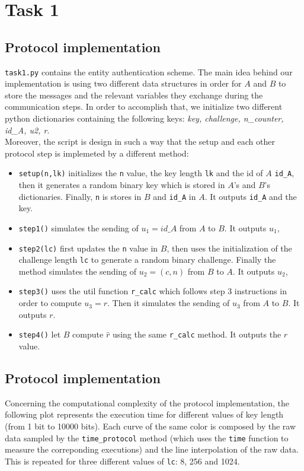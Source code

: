\documentclass{report}
\begin{document}
\section*{Task 1}
\subsection*{Protocol implementation}
{\tt task1.py} contains the entity authentication scheme. The main idea behind our implementation is using two different data structures in order for $A$ and $B$ to store the messages and the relevant variables they exchange during the communication steps. In order to accomplish that, we initialize two different python dictionaries containing the following keys: \textit{key, challenge, n\_counter, id\_A, u2, r}.\\
Moreover, the script is design in such a way that the setup and each other protocol step is implemeted by a different method:
\begin{itemize}

\item {\tt setup(n,lk)} initializes the {\tt n} value, the key length {\tt lk} and the id of $A$ {\tt id\_A}, then it generates a random binary key which is stored in $A$'s and $B$'s dictionaries. Finally, {\tt n} is stores in $B$ and {\tt id\_A} in $A$. It outputs {\tt id\_A} and the key.

\item {\tt step1()} simulates the sending of $u_1 = id\_A$ from $A$ to $B$. It outputs $u_1$,

\item{\tt  step2(lc)} first updates the {\tt n} value in $B$, then uses the initialization of the challenge length {\tt lc} to generate a random binary challenge. Finally the method simulates the sending of $u_2 = (c, n)$ from $B$ to $A$. It outputs $u_2$,

\item {\tt step3()} uses the util function {\tt r\_calc} which follows step 3 instructions in order to compute $u_3=r$. Then it simulates the sending of $u_3$ from $A$ to $B$. It outputs $r$.

\item {\tt step4()} let $B$ compute $\hat{r}$ using the same {\tt r\_calc} method. It outputs the $\hat{r}$ value.

\end{itemize}
 
 
 
\subsection*{Protocol implementation}
Concerning the computational complexity of the protocol implementation, the following plot represents the execution time for different values of key length (from 1 bit to 10000 bits). Each curve of the same color is composed by the raw data sampled by the {\tt time\_protocol} method (which uses the {\tt time} function to measure the correponding executions) and the line interpolation of the raw data. This is repeated for three different values of {\tt lc}: 8, 256 and 1024.   
\end{document}
